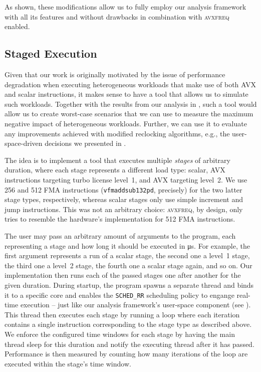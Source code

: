 As shown, these modifications allow us to fully employ our analysis framework with all its features and without drawbacks in combination with \textsc{avxfreq} enabled.

\subsection{Staged Execution}
\label{sec:evaluation:design:stagedexecution}

Given that our work is originally motivated by the issue of performance degradation when executing heterogeneous workloads that make use of both \gls{AVX} and scalar instructions, it makes sense to have a tool that allows us to simulate such workloads. Together with the results from our analysis in , such a tool would allow us to create worst-case scenarios that we can use to measure the maximum negative impact of heterogeneous workloads. Further, we can use it to evaluate any improvements achieved with modified reclocking algorithms, e.g., the user-space-driven decisions we presented in .

The idea is to implement a tool that executes multiple \emph{stages} of arbitrary duration, where each stage represents a different load type: scalar, \gls{AVX} instructions targeting turbo license level~1, and \gls{AVX} targeting level~2. We use \SI{256}{\bit} and \SI{512}{\bit} \gls{FMA} instructions (\texttt{vfmaddsub132pd}, precisely) for the two latter stage types, respectively, whereas scalar stages only use simple increment and jump instructions. This was not an arbitrary choice: \textsc{avxfreq}, by design, only tries to resemble the hardware's implementation for \SI{512}{\bit} \gls{FMA} instructions.

The user may pass an arbitrary amount of arguments to the program, each representing a stage and how long it should be executed in \si{\micro\second}. For example, the first argument represents a run of a scalar stage, the second one a level~1 stage, the third one a level~2 stage, the fourth one a scalar stage again, and so on. Our implementation then runs each of the passed stages one after another for the given duration. During startup, the program spawns a separate thread and binds it to a specific core and enables the \texttt{SCHED\_RR} scheduling policy to engange real-time execution -- just like our analysis framework's user-space component (see ). This thread then executes each stage by running a loop where each iteration contains a single instruction corresponding to the stage type as described above. We enforce the configured time windows for each stage by having the main thread sleep for this duration and notify the executing thread after it has passed. Performance is then measured by counting how many iterations of the loop are executed within the stage's time window.


